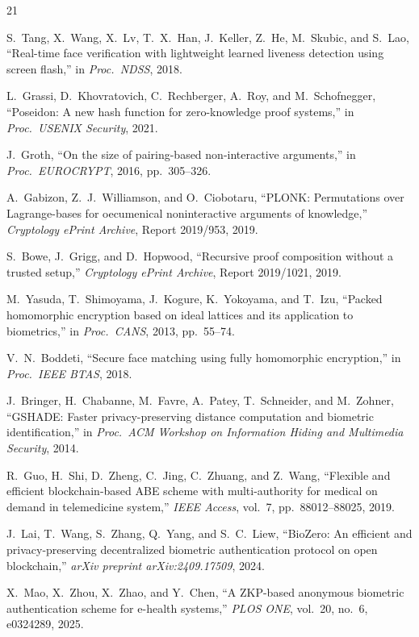 \documentclass[conference]{IEEEtran}
\begin{document}
\begin{thebibliography}{21}

S.~Tang, X.~Wang, X.~Lv, T.~X.~Han, J.~Keller, Z.~He, M.~Skubic, and S.~Lao,
``Real-time face verification with lightweight learned liveness detection using screen flash,''
in \emph{Proc.\ NDSS}, 2018.

L.~Grassi, D.~Khovratovich, C.~Rechberger, A.~Roy, and M.~Schofnegger,
``Poseidon: A new hash function for zero-knowledge proof systems,''
in \emph{Proc.\ USENIX Security}, 2021.

J.~Groth,
``On the size of pairing-based non-interactive arguments,''
in \emph{Proc.\ EUROCRYPT}, 2016, pp.~305--326.

A.~Gabizon, Z.~J.~Williamson, and O.~Ciobotaru,
``PLONK: Permutations over Lagrange-bases for oecumenical noninteractive arguments of knowledge,''
\emph{Cryptology ePrint Archive}, Report 2019/953, 2019.

S.~Bowe, J.~Grigg, and D.~Hopwood,
``Recursive proof composition without a trusted setup,''
\emph{Cryptology ePrint Archive}, Report 2019/1021, 2019.

M.~Yasuda, T.~Shimoyama, J.~Kogure, K.~Yokoyama, and T.~Izu,
``Packed homomorphic encryption based on ideal lattices and its application to biometrics,''
in \emph{Proc.\ CANS}, 2013, pp.~55--74.

V.~N.~Boddeti,
``Secure face matching using fully homomorphic encryption,''
in \emph{Proc.\ IEEE BTAS}, 2018.

J.~Bringer, H.~Chabanne, M.~Favre, A.~Patey, T.~Schneider, and M.~Zohner,
``GSHADE: Faster privacy-preserving distance computation and biometric identification,''
in \emph{Proc.\ ACM Workshop on Information Hiding and Multimedia Security}, 2014.

R.~Guo, H.~Shi, D.~Zheng, C.~Jing, C.~Zhuang, and Z.~Wang,
``Flexible and efficient blockchain-based ABE scheme with multi-authority for medical on demand in telemedicine system,''
\emph{IEEE Access}, vol.~7, pp.~88012--88025, 2019.

J.~Lai, T.~Wang, S.~Zhang, Q.~Yang, and S.~C.~Liew,
``BioZero: An efficient and privacy-preserving decentralized biometric authentication protocol on open blockchain,''
\emph{arXiv preprint arXiv:2409.17509}, 2024.

X.~Mao, X.~Zhou, X.~Zhao, and Y.~Chen,
``A ZKP-based anonymous biometric authentication scheme for e-health systems,''
\emph{PLOS ONE}, vol.~20, no.~6, e0324289, 2025.


\end{thebibliography}
\end{document}
